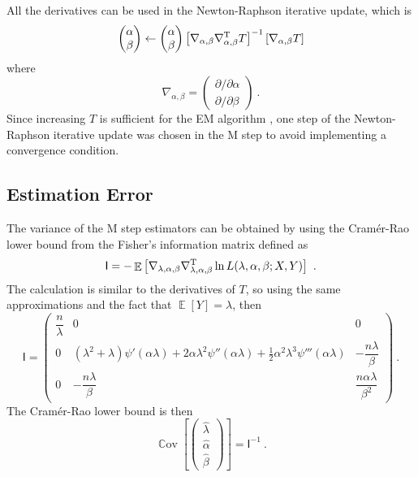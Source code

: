 \documentclass[12pt, a4paper]{memoir}
\DeclareMathOperator{\expectation}{\mathbb{E}}
\DeclareMathOperator{\cov}{\mathbb{C}ov}
\newcommand{\T}{^\textup{T}}
\newcommand{\matr}[1]{\mathsf{#1}}
\begin{document}
All the derivatives can be used in the Newton-Raphson iterative update, which is
\begin{equation}
	\begin{pmatrix}
		\alpha \\ \beta
	\end{pmatrix}
	\leftarrow
	\begin{pmatrix}
		\alpha \\ \beta
	\end{pmatrix}
	\left[
		\nabla_{\alpha,\beta}\nabla_{\alpha,\beta}\T T
	\right]^{-1}
	\left[
		\nabla_{\alpha,\beta} T
	\right]
\end{equation}
where
\begin{equation}
	\nabla_{\alpha,\beta}=
	\begin{pmatrix}
		{\partial}/{\partial \alpha}
		\\
		{\partial}/{\partial \beta}
	\end{pmatrix}
	\ .
\end{equation}
Since increasing $T$ is sufficient for the EM algorithm \citep{dempster1977maximum}, one step of the Newton-Raphson iterative update was chosen in the M step to avoid implementing a convergence condition.

\subsection{Estimation Error}

The variance of the M step estimators can be obtained by using the Cram\'er-Rao lower bound \citep{rao1945information} \citep{cramer1946mathematical} from the Fisher's information matrix defined as
\begin{equation}
	\matr{I} = -\expectation\left[
		\nabla_{\lambda,\alpha,\beta}\nabla_{\lambda,\alpha,\beta}\T \ln L(\lambda,\alpha,\beta;X,Y)
	\right]
	\ .
\end{equation}
The calculation is similar to the derivatives of $T$, so using the same approximations and the fact that $\expectation[Y]=\lambda$, then
\begin{equation}
	\matr{I}=
	\begin{pmatrix}
		\dfrac{n}{\lambda} & 0 & 0 \\
		0 & (\lambda^2+\lambda)\psi'(\alpha\lambda)+2\alpha\lambda^2\psi''(\alpha\lambda)+\frac{1}{2}\alpha^2\lambda^3\psi'''(\alpha\lambda) & -\dfrac{n\lambda}{\beta}\\
		0 & -\dfrac{n\lambda}{\beta} & \dfrac{n\alpha\lambda}{\beta^2}
	\end{pmatrix}
	\ .
\end{equation}
The Cram\'er-Rao lower bound is then
\begin{equation}
	\cov\left[
		\begin{pmatrix}
			\widehat{\lambda}\\\widehat{\alpha}\\\widehat{\beta}
		\end{pmatrix}
	\right]
	=
	\matr{I}^{-1}
	\ .
\end{equation}
\end{document}
